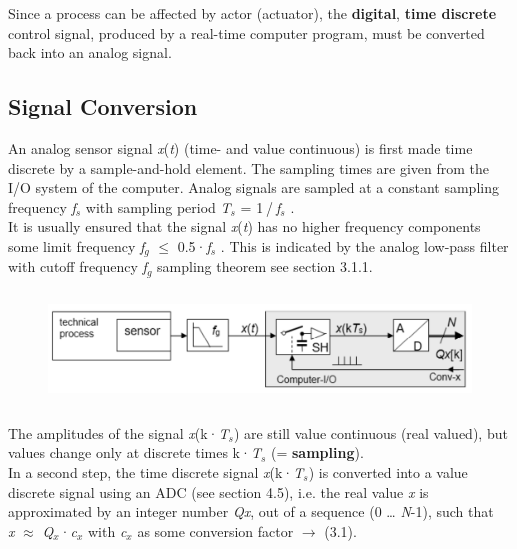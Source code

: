 Since a process can be affected by actor (actuator), the \textbf{digital}, \textbf{time discrete} control signal, produced by a real-time computer program, must be converted back into an analog signal.\\

\subsection{Signal Conversion}

An analog sensor signal \textit{x}(\textit{t}) (time- and value continuous) is first made time discrete by a sample-and-hold element. The sampling times are given from the I/O system of the computer. Analog signals are sampled at a constant sampling frequency \textit{f${}_{s}$} with sampling period \textit{T${}_{s}$} = 1${}_{\ }$/${}_{\ }$\textit{f${}_{s}$} .\\

It is usually ensured that the signal \textit{x}(\textit{t}) has no higher frequency components some limit frequency \textit{f${}_{g}$} $\mathrm{\le}$ 0.5·\textit{f${}_{s}$} . This is indicated by the analog low-pass filter with cutoff frequency \textit{f${}_{g}$}  sampling theorem see section 3.1.1.

    \begin{figure}[h]
    \centering
    \includegraphics[width=15cm, height=3cm]{Images/image137.png}
    \label{fig:Fig }
    \end{figure}

The amplitudes of the signal \textit{x}(k·\textit{T${}_{s}$}) are still value continuous (real valued), but values change only at discrete times k·\textit{T${}_{s}$} (= \textbf{sampling}).\\

In a second step, the time discrete signal \textit{x}(k·\textit{T${}_{s}$}) is converted into a value discrete signal using an ADC (see section 4.5), i.e. the real value \textit{x} is approximated by an integer number \textit{Qx}, out of a sequence (0 {\dots} \textit{N}-1), such that \\

\textit{x} $\mathrm{\approx}$ \textit{Q${}_{x}$}·\textit{c${}_{x}$}       with \textit{c${}_{x}$} as some conversion factor  $\rightarrow$ (3.1).\\


